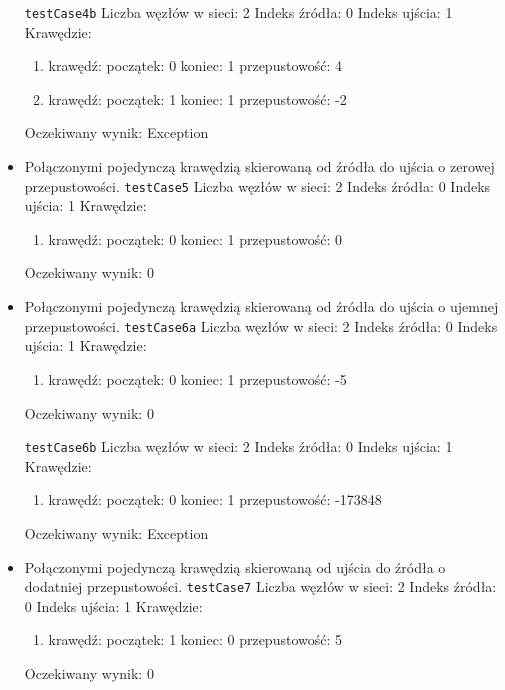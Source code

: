 \begin{itemize}[nosep]
    \texttt{testCase4b}
    Liczba węzłów w sieci: 2
    Indeks źródła: 0
    Indeks ujścia: 1
    Krawędzie:
    \begin{enumerate}[nosep]
        \item krawędź:
        początek: 0
        koniec: 1
        przepustowość: 4
        \item krawędź:
        początek: 1
        koniec: 1
        przepustowość: -2
    \end{enumerate}
    Oczekiwany wynik: Exception

    \item Połączonymi pojedynczą krawędzią skierowaną od źródła do ujścia o zerowej przepustowości.
    \texttt{testCase5}
    Liczba węzłów w sieci: 2
    Indeks źródła: 0
    Indeks ujścia: 1
    Krawędzie:
    \begin{enumerate}[nosep]
        \item krawędź:
        początek: 0
        koniec: 1
        przepustowość: 0
    \end{enumerate}
    Oczekiwany wynik: 0

    \item Połączonymi pojedynczą krawędzią skierowaną od źródła do ujścia o ujemnej przepustowości.
    \texttt{testCase6a}
    Liczba węzłów w sieci: 2
    Indeks źródła: 0
    Indeks ujścia: 1
    Krawędzie:
    \begin{enumerate}[nosep]
        \item krawędź:
        początek: 0
        koniec: 1
        przepustowość: -5
    \end{enumerate}
    Oczekiwany wynik: 0

    \texttt{testCase6b}
    Liczba węzłów w sieci: 2
    Indeks źródła: 0
    Indeks ujścia: 1
    Krawędzie:
    \begin{enumerate}[nosep]
        \item krawędź:
        początek: 0
        koniec: 1
        przepustowość: -173848
    \end{enumerate}
    Oczekiwany wynik: Exception

    \item Połączonymi pojedynczą krawędzią skierowaną od ujścia do źródła o dodatniej przepustowości.
    \texttt{testCase7}
    Liczba węzłów w sieci: 2
    Indeks źródła: 0
    Indeks ujścia: 1
    Krawędzie:
    \begin{enumerate}[nosep]
        \item krawędź:
        początek: 1
        koniec: 0
        przepustowość: 5
    \end{enumerate}
    Oczekiwany wynik: 0


\end{itemize}
